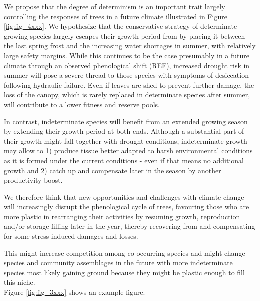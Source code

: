 \documentclass{article}
\begin{document}
We propose that the degree of determinism is an important trait largely controlling the responses of trees in a future climate illustrated in Figure \ref{fig:fig_4xxx}. We hypothesize that the conservative strategy of determinate growing species largely escapes their growth period from by placing it between the last spring frost and the increasing water shortages in summer, with relatively large safety margins. While this continues to be the case presumably in a future climate through an observed phenological shift (REF), increased drought risk in summer will pose a severe thread to those species with symptoms of desiccation following hydraulic failure. Even if leaves are shed to prevent further damage, the loss of the canopy, which is rarely replaced in determinate species after summer, will contribute to a lower fitness and reserve pools. 

In contrast, indeterminate species will benefit from an extended growing season by extending their growth period at both ends. Although a substantial part of their growth might fall together with drought conditions, indeterminate growth may allow to 1) produce tissue better adapted to harsh environmental conditions as it is formed under the current conditions - even if that means no additional growth and 2) catch up and compensate later in the season by another productivity boost. 

We therefore think that new opportunities and challenges with climate change will increasingly disrupt the phenological cycle of trees, favouring those who are more plastic in rearranging their activities by resuming growth, reproduction and/or storage filling later in the year, thereby recovering from and compensating for some stress-induced damages and losses.

This might increase competition among co-occurring species and might change species and community assemblages in the future with more indeterminate species most likely gaining ground because they might be plastic enough to fill this niche. \\



	
			Figure \ref{fig:fig_3xxx} shows an example figure.
	
\end{document}
